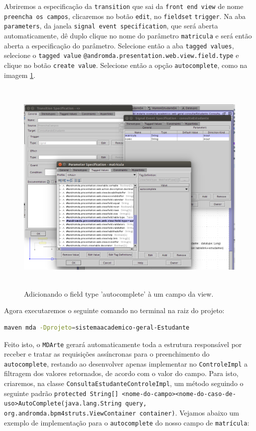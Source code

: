 Abriremos a especificação da \texttt{transition} que sai da \texttt{front end
view} de nome \texttt{preencha os campos}, clicaremos no botão \texttt{edit}, no
\texttt{fieldset} \texttt{trigger}. Na aba \texttt{parameters}, da janela
\texttt{signal event specification}, que será aberta automaticamente, dê duplo
clique no nome do parâmetro \texttt{matricula} e será então aberta a
especificação do parâmetro. Selecione então a aba \texttt{tagged values},
selecione o \texttt{tagged value}
\texttt{@andromda.presentation.web.view.field.type} e clique no botão
\texttt{create value}. Selecione então a opção \texttt{autocomplete}, como na
imagem \ref{field_type_autocomplete}.
\begin{figure}[H]
	\centering
	\includegraphics[width=350pt,height=300pt]{files/imgs/tutorial-mdarte-0027.png}
	\caption{Adicionando o field type 'autocomplete' à um campo da view.}
	\label{field_type_autocomplete}
\end{figure}

Agora executaremos o seguinte comando no terminal na raiz do projeto:
\begin{lstlisting}[language=bash]
maven mda -Dprojeto=sistemaacademico-geral-Estudante
\end{lstlisting}

Feito isto, o \texttt{MDArte} gerará automaticamente toda a estrutura
responsável por receber e tratar as requisições assíncronas para o preenchimento do
\texttt{autocomplete}, restando ao desenvolver apenas implementar no
\texttt{ControleImpl} a filtragem dos valores retornados, de acordo com o valor
do campo. Para isto, criaremos, na classe
\texttt{ConsultaEstudanteControleImpl}, um método seguindo o seguinte padrão 
\texttt{protected String[]
<nome-do-campo><nome-do-caso-de-uso>AutoComplete(java.lang.String query,
org.andromda.bpm4struts.ViewContainer container)}. Vejamos abaixo um exemplo de
implementação para o \texttt{autocomplete} do nosso campo de \texttt{matrícula}:

